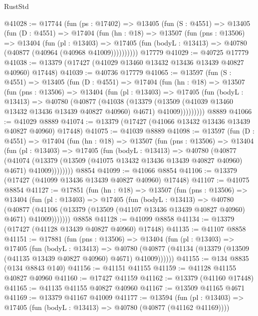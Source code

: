 \begin{lexlean}{RustStd}
\begin{coremodule}
@41028 := @17744
    (fun (ps : @17402) =>
    @13405
      (fun (S : @4551) =>
      @13405
        (fun (D : @4551) =>
        @17404
          (fun (hn : @18) =>
          @13507
            (fun (pns : @13506) =>
            @13404
              (fun (pl : @13403) =>
              @17405 (fun (bodyL : @13413) => @40780 (@40877 (@40964 (@40968 @41009))))))))))
    @17779
@41029 := @40725 @17779
@41038 := @13379 (@17427 (@41029 @13460 @13432 @13436 @13439 @40827 @40960) @17448)
@41039 := @40736 @17779
@41065 := @13597
    (fun (S : @4551) =>
    @13405
      (fun (D : @4551) =>
      @17404
        (fun (hn : @18) =>
        @13507
          (fun (pns : @13506) =>
          @13404
            (fun (pl : @13403) =>
            @17405
              (fun (bodyL : @13413) =>
              @40780
                (@40877
                  (@41038
                    (@13379
                      (@13509 (@41039 @13460 @13432 @13436 @13439 @40827 @40960) @4671)
                      @41009)))))))))
    @8889
@41066 := @41029 @8889
@41074 := @13379 (@17427 (@41066 @13432 @13436 @13439 @40827 @40960) @17448)
@41075 := @41039 @8889
@41098 := @13597
    (fun (D : @4551) =>
    @17404
      (fun (hn : @18) =>
      @13507
        (fun (pns : @13506) =>
        @13404
          (fun (pl : @13403) =>
          @17405
            (fun (bodyL : @13413) =>
            @40780
              (@40877
                (@41074
                  (@13379 (@13509 (@41075 @13432 @13436 @13439 @40827 @40960) @4671) @41009))))))))
    @8854
@41099 := @41066 @8854
@41106 := @13379 (@17427 (@41099 @13436 @13439 @40827 @40960) @17448)
@41107 := @41075 @8854
@41127 := @17851
    (fun (hn : @18) =>
    @13507
      (fun (pns : @13506) =>
      @13404
        (fun (pl : @13403) =>
        @17405
          (fun (bodyL : @13413) =>
          @40780
            (@40877
              (@41106 (@13379 (@13509 (@41107 @13436 @13439 @40827 @40960) @4671) @41009)))))))
    @8858
@41128 := @41099 @8858
@41134 := @13379 (@17427 (@41128 @13439 @40827 @40960) @17448)
@41135 := @41107 @8858
@41151 := @17881
    (fun (pns : @13506) =>
    @13404
      (fun (pl : @13403) =>
      @17405
        (fun (bodyL : @13413) =>
        @40780 (@40877 (@41134 (@13379 (@13509 (@41135 @13439 @40827 @40960) @4671) @41009))))))
@41155 := @134 @8835 (@134 @8843 @140)
@41156 := @41151 @41155
@41159 := @41128 @41155 @40827 @40960
@41160 := @17427 @41159
@41162 := @13379 (@41160 @17448)
@41165 := @41135 @41155 @40827 @40960
@41167 := @13509 @41165 @4671
@41169 := @13379 @41167 @41009
@41177 := @13594
    (fun (pl : @13403) => @17405 (fun (bodyL : @13413) => @40780 (@40877 (@41162 @41169))))

\end{coremodule}
\end{lexlean}
